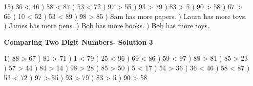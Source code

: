 \documentclass{article}%
\begin{document}
15) 36 < 46%
) 58 < 87%
) 53 < 72%
) 97 > 55%
) 93 > 79%
) 83 > 5%
) 90 > 58%
) 67 > 66%
) 10 < 52%
) 53 < 89%
) 98 > 85%
) Sam has more papers.%
) Laura has more toys.%
) James has more pens.%
) Bob has more books.%
) Bob has more toys.%
\newline%
\newpage%
\large%
\begin{center}%
\textbf{Comparing Two Digit Numbers- Solution 3}%
\newline%
\end{center} \normalsize%
1) 88 > 67%
) 81 > 71%
) 1 < 79%
) 25 < 96%
) 69 < 86%
) 59 < 97%
) 88 > 81%
) 85 > 23%
) 57 > 44%
) 84 > 14%
) 98 > 28%
) 85 > 50%
) 5 < 17%
) 54 > 36%
) 36 < 46%
) 58 < 87%
) 53 < 72%
) 97 > 55%
) 93 > 79%
) 83 > 5%
) 90 > 58%
\newline%
\end{document}
